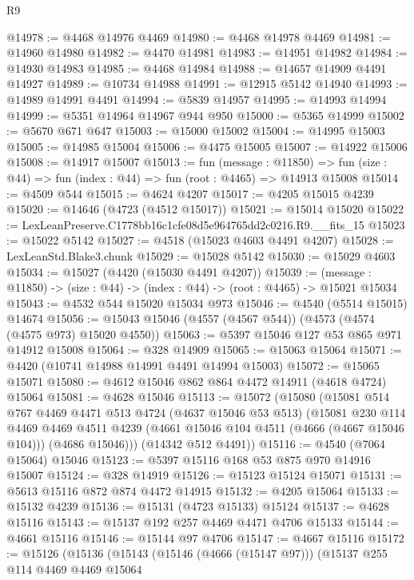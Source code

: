 \begin{lexlean}{R9}
\begin{coremodule}
@14978 := @4468 @14976 @4469
@14980 := @4468 @14978 @4469
@14981 := @14960 @14980
@14982 := @4470 @14981
@14983 := @14951 @14982
@14984 := @14930 @14983
@14985 := @4468 @14984
@14988 := @14657 @14909 @4491 @14927
@14989 := @10734 @14988
@14991 := @12915 @5142 @14940
@14993 := @14989 @14991 @4491
@14994 := @5839 @14957
@14995 := @14993 @14994
@14999 := @5351 @14964 @14967 @944 @950
@15000 := @5365 @14999
@15002 := @5670 @671 @647
@15003 := @15000 @15002
@15004 := @14995 @15003
@15005 := @14985 @15004
@15006 := @4475 @15005
@15007 := @14922 @15006
@15008 := @14917 @15007
@15013 := fun (message : @11850) =>
  fun (size : @44) => fun (index : @44) => fun (root : @4465) => @14913 @15008
@15014 := @4509 @544
@15015 := @4624 @4207
@15017 := @4205 @15015 @4239
@15020 := @14646 (@4723 (@4512 @15017))
@15021 := @15014 @15020
@15022 := LexLeanPreserve.C1778bb16c1cfe08d5e964765dd2c0216.R9.__fits_15
@15023 := @15022 @5142
@15027 := @4518 (@15023 @4603 @4491 @4207)
@15028 := LexLeanStd.Blake3.chunk
@15029 := @15028 @5142
@15030 := @15029 @4603
@15034 := @15027 (@4420 (@15030 @4491 @4207))
@15039 := (message : @11850) -> (size : @44) -> (index : @44) -> (root : @4465) -> @15021 @15034
@15043 := @4532 @544 @15020 @15034 @973
@15046 := @4540 (@5514 @15015) @14674
@15056 := @15043 @15046 (@4557 (@4567 @544)) (@4573 (@4574 (@4575 @973) @15020 @4550))
@15063 := @5397 @15046 @127 @53 @865 @971 @14912 @15008
@15064 := @328 @14909
@15065 := @15063 @15064
@15071 := @4420 (@10741 @14988 @14991 @4491 @14994 @15003)
@15072 := @15065 @15071
@15080 := @4612 @15046 @862 @864 @4472 @14911 (@4618 @4724) @15064
@15081 := @4628 @15046
@15113 := @15072
    (@15080
      (@15081
        @514
        @767
        @4469
        @4471
        @513
        @4724
        (@4637 @15046 @53 @513)
        (@15081
          @230
          @114
          @4469
          @4469
          @4511
          @4239
          (@4661 @15046 @104 @4511 (@4666 (@4667 @15046 @104)))
          (@4686 @15046)))
      (@14342 @512 @4491))
@15116 := @4540 (@7064 @15064) @15046
@15123 := @5397 @15116 @168 @53 @875 @970 @14916 @15007
@15124 := @328 @14919
@15126 := @15123 @15124 @15071
@15131 := @5613 @15116 @872 @874 @4472 @14915
@15132 := @4205 @15064
@15133 := @15132 @4239
@15136 := @15131 (@4723 @15133) @15124
@15137 := @4628 @15116
@15143 := @15137 @192 @257 @4469 @4471 @4706 @15133
@15144 := @4661 @15116
@15146 := @15144 @97 @4706
@15147 := @4667 @15116
@15172 := @15126
    (@15136
      (@15143
        (@15146 (@4666 (@15147 @97)))
        (@15137
          @255
          @114
          @4469
          @4469
          @15064

\end{coremodule}
\end{lexlean}
